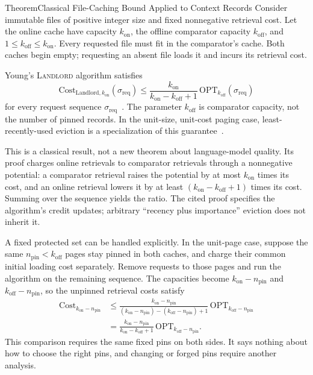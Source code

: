 \documentclass[11pt,a4paper]{article}
\theoremstyle{definition}
\theoremstyle{plain}
\begin{document}
\begin{pdclaim}{Theorem}{Classical File-Caching Bound Applied to Context Records}
\label{thm:paging}
Consider immutable files of positive integer size and fixed nonnegative retrieval cost. Let the online cache have capacity $k_{\mathrm{on}}$, the offline comparator capacity $k_{\mathrm{off}}$, and $1\le k_{\mathrm{off}}\le k_{\mathrm{on}}$. Every requested file must fit in the comparator's cache. Both caches begin empty; requesting an absent file loads it and incurs its retrieval cost.

Young's \textsc{Landlord} algorithm satisfies
\[
\mathrm{Cost}_{\mathrm{Landlord},k_{\mathrm{on}}}(\sigma_{\mathrm{req}})
\le \frac{k_{\mathrm{on}}}{k_{\mathrm{on}}-k_{\mathrm{off}}+1}\,\mathrm{OPT}_{k_{\mathrm{off}}}(\sigma_{\mathrm{req}})
\]
for every request sequence $\sigma_{\mathrm{req}}$~. The parameter $k_{\mathrm{off}}$ is comparator capacity, not the number of pinned records. In the unit-size, unit-cost paging case, least-recently-used eviction is a specialization of this guarantee~.
\end{pdclaim}

This is a classical result, not a new theorem about language-model quality. Its proof charges online retrievals to comparator retrievals through a nonnegative potential: a comparator retrieval raises the potential by at most $k_{\mathrm{on}}$ times its cost, and an online retrieval lowers it by at least $(k_{\mathrm{on}}-k_{\mathrm{off}}+1)$ times its cost. Summing over the sequence yields the ratio. The cited proof specifies the algorithm's credit updates; arbitrary ``recency plus importance'' eviction does not inherit it.

A fixed protected set can be handled explicitly. In the unit-page case, suppose the same $n_{\mathrm{pin}}<k_{\mathrm{off}}$ pages stay pinned in both caches, and charge their common initial loading cost separately. Remove requests to those pages and run the algorithm on the remaining sequence. The capacities become $k_{\mathrm{on}}-n_{\mathrm{pin}}$ and $k_{\mathrm{off}}-n_{\mathrm{pin}}$, so the unpinned retrieval costs satisfy
\[
\begin{aligned}
\mathrm{Cost}_{k_{\mathrm{on}}-n_{\mathrm{pin}}}
&\le\frac{k_{\mathrm{on}}-n_{\mathrm{pin}}}{(k_{\mathrm{on}}-n_{\mathrm{pin}})-(k_{\mathrm{off}}-n_{\mathrm{pin}})+1}\,\mathrm{OPT}_{k_{\mathrm{off}}-n_{\mathrm{pin}}}\\
&=\frac{k_{\mathrm{on}}-n_{\mathrm{pin}}}{k_{\mathrm{on}}-k_{\mathrm{off}}+1}\,\mathrm{OPT}_{k_{\mathrm{off}}-n_{\mathrm{pin}}}.
\end{aligned}
\]
This comparison requires the same fixed pins on both sides. It says nothing about how to choose the right pins, and changing or forged pins require another analysis.
\end{document}
